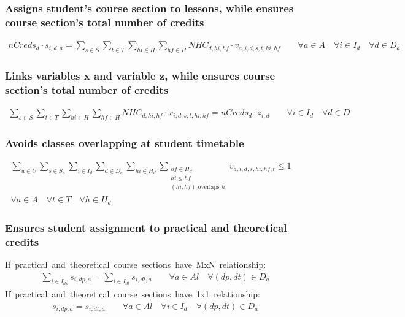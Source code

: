 \subsubsection{Assigns student's course section to lessons, while ensures course section's total number of credits}
\begin{eqnarray}
nCreds_{d} \cdot s_{i,d,a} = \sum\limits_{s \in S}\sum\limits_{t \in T}\sum\limits_{hi \in H}\sum\limits_{hf \in H} NHC_{d,hi,hf} \cdot v_{a,i,d,s,t,hi,hf} \nonumber \qquad 
\forall a \in A \quad
\forall i \in I_{d} \quad
\forall d \in D_{a}
\end{eqnarray}

\subsubsection{Links variables x and variable z, while ensures course section's total number of credits}
\begin{eqnarray}
\sum\limits_{s \in S}\sum\limits_{t \in T}\sum\limits_{hi \in H}\sum\limits_{hf \in H} NHC_{d,hi,hf} \cdot x_{i,d,s,t,hi,hf} = nCreds_{d} \cdot z_{i,d} \nonumber \qquad
\forall i \in I_{d} \quad
\forall d \in D \quad
\end{eqnarray}

\subsubsection{Avoids classes overlapping at student timetable}
\begin{eqnarray}
\sum\limits_{u \in U} \sum\limits_{s \in S_{u}} \sum\limits_{i \in I_{d}} \sum\limits_{d \in D_{a}} \sum\limits_{hi \in H_{d}} \sum_{\substack {hf \in H_{d} \\ hi\le hf \\ (hi,hf)\mbox{ overlaps }h}} v_{a,i,d,s,hi,hf,t}  \leq  1  \nonumber \qquad 
\\
\forall a \in A \quad
\forall t \in T \quad
\forall h \in H_{d}
\end{eqnarray}

\subsubsection{Ensures student assignment to practical and theoretical credits}
\mbox{If practical and theoretical course sections have MxN relationship:}
\begin{eqnarray}
\sum\limits_{i \in I_{dp}} s_{i,dp,a} = \sum\limits_{ i \in I_{dt} } s_{i,dt,a} \nonumber \qquad 
\forall a \in Al \quad
\forall (dp,dt) \in D_{a} \quad
\end{eqnarray}
\mbox{If practical and theoretical course sections have 1x1 relationship:}
\begin{eqnarray}
s_{i,dp,a} = s_{i,dt,a} \nonumber \qquad 
\forall a \in Al \quad
\forall i \in I_{d} \quad
\forall (dp,dt) \in D_{a} \quad
\end{eqnarray}

